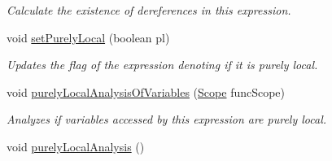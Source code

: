 \begin{DoxyCompactItemize}
\begin{DoxyCompactList}\small\item\em Calculate the existence of dereferences in this expression. \end{DoxyCompactList}\item 
void \hyperlink{classedu_1_1udel_1_1cis_1_1vsl_1_1civl_1_1model_1_1common_1_1expression_1_1CommonDotExpression_aa1b848a77892634f307834992a06d3e6}{set\+Purely\+Local} (boolean pl)
\begin{DoxyCompactList}\small\item\em Updates the flag of the expression denoting if it is purely local. \end{DoxyCompactList}\item 
void \hyperlink{classedu_1_1udel_1_1cis_1_1vsl_1_1civl_1_1model_1_1common_1_1expression_1_1CommonDotExpression_a8aa886fac645aa90d27d34fb21044b82}{purely\+Local\+Analysis\+Of\+Variables} (\hyperlink{interfaceedu_1_1udel_1_1cis_1_1vsl_1_1civl_1_1model_1_1IF_1_1Scope}{Scope} func\+Scope)
\begin{DoxyCompactList}\small\item\em Analyzes if variables accessed by this expression are purely local. \end{DoxyCompactList}\item 
\hypertarget{classedu_1_1udel_1_1cis_1_1vsl_1_1civl_1_1model_1_1common_1_1expression_1_1CommonDotExpression_adfb357313ca4cbd62ecee7daedbd9449}{}void \hyperlink{classedu_1_1udel_1_1cis_1_1vsl_1_1civl_1_1model_1_1common_1_1expression_1_1CommonDotExpression_adfb357313ca4cbd62ecee7daedbd9449}{purely\+Local\+Analysis} ()\label{classedu_1_1udel_1_1cis_1_1vsl_1_1civl_1_1model_1_1common_1_1expression_1_1CommonDotExpression_adfb357313ca4cbd62ecee7daedbd9449}


\end{DoxyCompactItemize}
